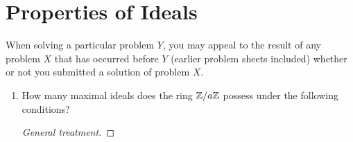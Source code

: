 \documentclass[../psets.tex]{subfiles}
\begin{document}
\section{Properties of Ideals}
When solving a particular problem $Y$, you may appeal to the result of any problem $X$ that has occurred before $Y$ (earlier problem sheets included) whether or not you submitted a solution of problem $X$.
\begin{enumerate}
    \item {}How many maximal ideals does the ring $\mathbb{Z}/a\mathbb{Z}$ possess under the following conditions?
    \begin{proof}[General treatment]



        



\end{proof}
\end{enumerate}
\end{document}
